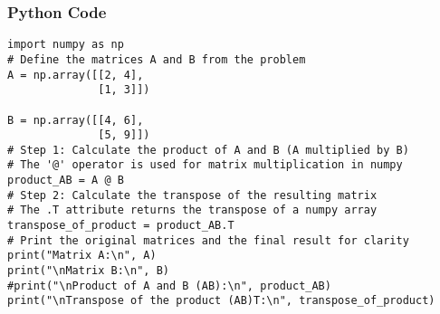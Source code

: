 \documentclass{beamer}
\begin{document}
\begin{frame}[fragile]
\frametitle{Python Code}
\begin{lstlisting}
import numpy as np
# Define the matrices A and B from the problem
A = np.array([[2, 4], 
              [1, 3]])

B = np.array([[4, 6], 
              [5, 9]])
# Step 1: Calculate the product of A and B (A multiplied by B)
# The '@' operator is used for matrix multiplication in numpy
product_AB = A @ B
# Step 2: Calculate the transpose of the resulting matrix
# The .T attribute returns the transpose of a numpy array
transpose_of_product = product_AB.T
# Print the original matrices and the final result for clarity
print("Matrix A:\n", A)
print("\nMatrix B:\n", B)
#print("\nProduct of A and B (AB):\n", product_AB)
print("\nTranspose of the product (AB)T:\n", transpose_of_product)

\end{lstlisting}
\end{frame}
\end{document}
